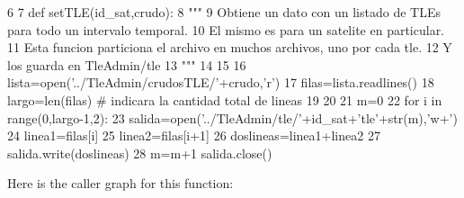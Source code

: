 \begin{DoxyCode}
6 
7 def setTLE(id_sat,crudo):
8     """
9     Obtiene un dato con un listado de TLEs para todo un intervalo temporal.
10     El mismo es para un satelite en particular.
11     Esta funcion particiona el archivo en muchos archivos, uno por cada tle.
12     Y los guarda en TleAdmin/tle
13     """
14     
15     
16     lista=open('../TleAdmin/crudosTLE/'+crudo,'r')
17     filas=lista.readlines()
18     largo=len(filas) # indicara la cantidad total de lineas
19         
20     
21     m=0
22     for i in range(0,largo-1,2):
23         salida=open('../TleAdmin/tle/'+id_sat+'tle'+str(m),'w+')
24         linea1=filas[i]
25         linea2=filas[i+1]
26         doslineas=linea1+linea2
27         salida.write(doslineas)
28         m=m+1
        salida.close()\end{DoxyCode}


\-Here is the caller graph for this function\-:


